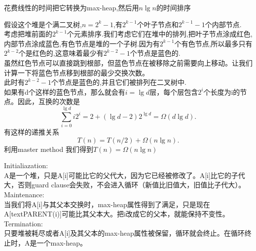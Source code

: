\documentclass[a4paper, justified]{tufte-handout}
\begin{document}
\begin{problem}[TC 6.4-4]
\end{problem}

\begin{solution}
  花费线性的时间把它转换为max-heap,然后用$n \lg n$的时间排序
\end{solution}

\begin{problem}
\end{problem}

\begin{solution}
  假设这个堆是个满二叉树,$n=2^k - 1$,有$2^{k-1}$个叶子节点和$2^{k-1}-1$个内部节点.\\
  考虑把堆前面的$2^{k-1}$个元素排序.我们考虑它们在堆中的排列,把叶子节点涂成红色,内部节点涂成蓝色,有色节点是堆的一个子树.因为有$2^{k-1}$个有色节点,所以最多只有$2^{k - 2}$个是红色的,这意味着最少有$2^{k - 2} - 1$个节点是蓝色的.\\
  虽然红色节点可以直接跳到根部，但蓝色节点在被移除之前需要向上移动。让我们计算一下将蓝色节点移到根部的最少交换次数。\\
  此时有$2^{k - 2} - 1$个节点是蓝色的,并且它们被排列在二叉树中.\\
  如果有d个这样的蓝色节点，那么就会有$i=\lg d$层，每个层包含$2^i$个长度为i的节点。因此，互换的次数是
  $$
    \sum_{i = 0}^{\lg d}i2^i = 2 + (\lg d - 2)2^{\lg d} = \Omega(d\lg d).$$
  有这样的递推关系
  $$T(n) = T(n / 2) + \Omega(n\lg n).$$
  利用master method 我们得到$T(n) = \Omega(n\lg n)$
\end{solution}

\begin{problem}[TC 6.5-5]
\end{problem}

\begin{solution}
  Initialiazation:\\
  A是一个堆，只是A[i]可能比它的父代大，因为它已经被修改了。A[i]比它的子代大，否则guard clause会失败，不会进入循环（新值比旧值大，旧值比子代大）。\\
  Maintenance:\\
  当我们将A[i]与其父本交换时，max-heap属性得到了满足，只是现在A[text{PARENT}(i)]可能比其父本大。把i改成它的父本，就能保持不变性。\\
  Termination:\\
  只要堆被耗尽或者A[i]及其父本的max-heap属性被保留，循环就会终止。在循环终止时，A是一个max-heap。
\end{solution}
\end{document}
